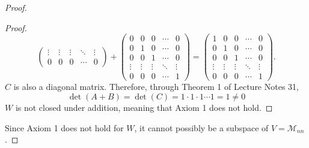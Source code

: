\documentclass{article}
\begin{document}
\begin{proof}
\begin{proof}
\[\begin{pmatrix}
                \vdots & \vdots & \vdots & \ddots & \vdots \\
                0      & 0      & 0      & \cdots & 0
            \end{pmatrix} + \begin{pmatrix}
                0      & 0      & 0      & \cdots & 0      \\
                0      & 1      & 0      & \cdots & 0      \\
                0      & 0      & 1      & \cdots & 0      \\
                \vdots & \vdots & \vdots & \ddots & \vdots \\
                0      & 0      & 0      & \cdots & 1
            \end{pmatrix} = \begin{pmatrix}
                1      & 0      & 0      & \cdots & 0      \\
                0      & 1      & 0      & \cdots & 0      \\
                0      & 0      & 1      & \cdots & 0      \\
                \vdots & \vdots & \vdots & \ddots & \vdots \\
                0      & 0      & 0      & \cdots & 1
            \end{pmatrix}.
        \]
        $C$ is also a diagonal matrix. Therefore, through Theorem 1 of Lecture Notes 31,
        \[
            \det(A + B) = \det(C) = 1 \cdot 1 \cdot 1 \cdots 1 = 1 \neq 0
        \]
        $W$ is not closed under addition, meaning that Axiom 1 does not hold.
    \end{proof}
    Since Axiom 1 does not hold for $W$, it cannot possibly be a subspace of $V = \mathcal{M}_{nn}$.
\end{proof}
\qdash
\end{document}
